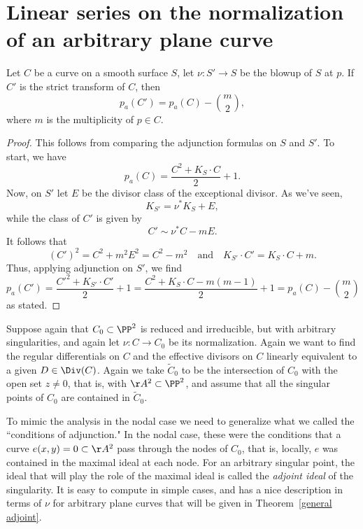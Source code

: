 \section{Linear series on the normalization of an arbitrary plane curve} \label{arbitrary plane curves}

\begin{proposition}\label{effect of blowup on genus}
 Let $C$ be a curve on a smooth surface $S$, let $\nu : S' \to S$ be the blowup of $S$ at $p$. If $C'$ is the strict transform of $C$, then
 $$
 p_a(C') = p_a(C) -{m\choose 2},
 $$
 where $m$ is the multiplicity of $p\in C$.
\end{proposition}
\begin{proof}
This follows from comparing the adjunction formulas on $S$ and $S'$. To start, we have
$$
p_a(C) = \frac{C^2 + K_S\cdot C}{2} + 1.
$$
Now, on $S'$ let $E$ be the divisor class of the exceptional divisor. As we've seen,
$$
K_{S'} = \nu^*K_S + E,
$$
while the class of $C'$ is given by
$$
C' \sim \nu^*C - mE.
$$
It follows that
$$
(C')^2 = C^2 + m^2E^2 = C^2 - m^2 \quad \text{and} \quad K_{S'}\cdot C' = K_S\cdot C + m.
$$
Thus, applying adjunction on $S'$, we find
$$
p_a(C') = \frac{{C'}^2 + K_{S'}\cdot C'}{2} + 1 = \frac{C^2 + K_S\cdot C - m(m-1)}{2} + 1 = p_a(C) -{m\choose 2}
$$
as stated.
\end{proof}


Suppose again that $C_0 \subset \PP^2$ is reduced and irreducible, but with arbitrary singularities, and again let $\nu : C \to C_0$ be its normalization. Again we want to find the regular differentials on $C$ and the effective divisors on $C$ linearly equivalent to a given $D \in \Div(C)$. Again we take $\widetilde C_0$ to be the intersection of $C_0$ with the open set $z \neq 0$, that is, with $\AA^2\subset \PP^2$, and assume that
all the singular points of $C_0$ are contained in $\widetilde C_0$.

To mimic the analysis in the nodal case we need to generalize what we called the ``conditions of adjunction." In the nodal case, these were the conditions that a curve $e(x,y)=0 \subset \AA^2$ pass through the nodes of $C_0$, that is, locally, $e$ was contained in the maximal ideal
at each node. For an arbitrary singular point, the ideal that will play the role of the maximal ideal is called the \emph{adjoint ideal} of the singularity. It is easy to compute in simple cases, and has a nice description in terms of $\nu$ for arbitrary plane curves that will be given in Theorem~\ref{general adjoint}.


